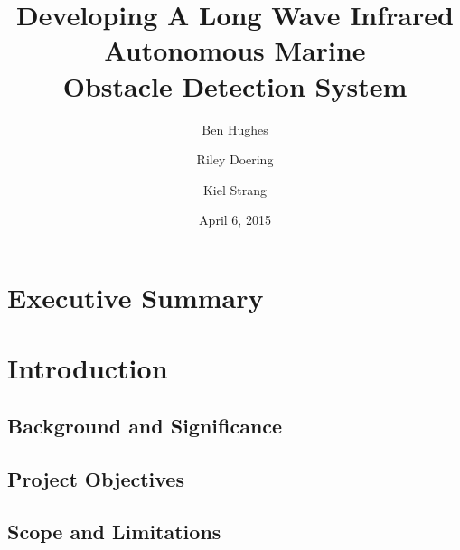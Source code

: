 \documentclass[amsmath, amssymb, aps, pra, 12pt]{revtex4-1}
\begin{document}
\title{Developing A Long Wave Infrared\\ Autonomous Marine\\ Obstacle Detection System}
\author{Ben Hughes}
\author{Riley Doering}
\author{Kiel Strang}
\noaffiliation
\date{April 6, 2015}
\maketitle


\section*{Executive Summary}


\newpage
\tableofcontents

\makeatletter
\let\toc@pre\relax
\let\toc@post\relax
\makeatother 

\newpage
\listoffigures
\listoftables

\clearpage
\newpage
{}


\section{\label{sec:introduction}Introduction}


\subsection{\label{sec:introduction:backgroundandsignificance}Background and Significance}


\subsection{\label{sec:introduction:projectobjectives}Project Objectives}


\subsection{\label{sec:introduction:scopeandlimitations}Scope and Limitations}

\end{document}
